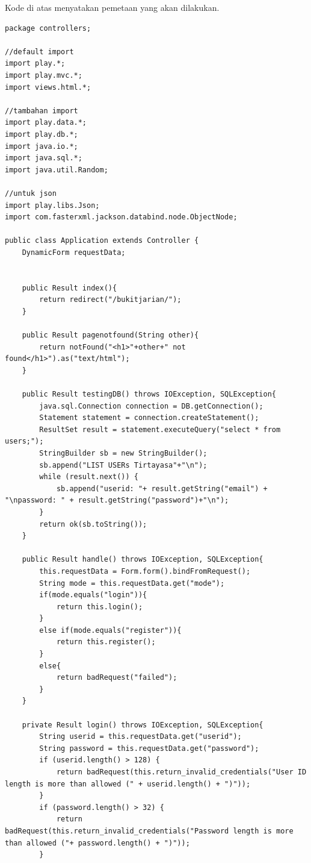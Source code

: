 \documentclass[a4paper,twoside]{article}
\begin{document}
\begin{enumerate}
Kode di atas menyatakan pemetaan yang akan dilakukan.

\begin{lstlisting}[caption=Application.java,label={lst:aplication.java}]
package controllers;

//default import
import play.*;
import play.mvc.*;
import views.html.*;

//tambahan import
import play.data.*;
import play.db.*;
import java.io.*;
import java.sql.*;
import java.util.Random;

//untuk json
import play.libs.Json;
import com.fasterxml.jackson.databind.node.ObjectNode;

public class Application extends Controller {
	DynamicForm requestData;
    

	public Result index(){
		return redirect("/bukitjarian/");
	}

    public Result pagenotfound(String other){
        return notFound("<h1>"+other+" not found</h1>").as("text/html");
    }

    public Result testingDB() throws IOException, SQLException{
    	java.sql.Connection connection = DB.getConnection();
        Statement statement = connection.createStatement();
        ResultSet result = statement.executeQuery("select * from users;");
        StringBuilder sb = new StringBuilder();
        sb.append("LIST USERs Tirtayasa"+"\n");
        while (result.next()) {
            sb.append("userid: "+ result.getString("email") + "\npassword: " + result.getString("password")+"\n");
        }
        return ok(sb.toString());
    }

    public Result handle() throws IOException, SQLException{
    	this.requestData = Form.form().bindFromRequest();
    	String mode = this.requestData.get("mode");
        if(mode.equals("login")){
        	return this.login();
        }
        else if(mode.equals("register")){
        	return this.register();
        }
        else{
        	return badRequest("failed");
        }
    }

    private Result login() throws IOException, SQLException{
    	String userid = this.requestData.get("userid");
    	String password = this.requestData.get("password");
    	if (userid.length() > 128) {
			return badRequest(this.return_invalid_credentials("User ID length is more than allowed (" + userid.length() + ")"));
		}
		if (password.length() > 32) {
			return badRequest(this.return_invalid_credentials("Password length is more than allowed ("+ password.length() + ")"));
		}


\end{lstlisting}
\end{enumerate}
\end{document}
